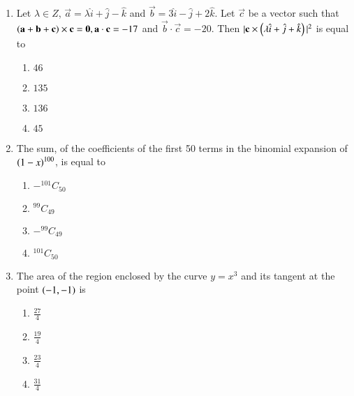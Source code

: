 \documentclass[journal,12pt,twocolumn]{IEEEtran}
\theoremstyle{remark}
\begin{document}
\begin{enumerate}
\begin{align*}
\end{align*}
is a tautology 
\begin{multicols}{2}
\begin{enumerate}
    \item only$\brak{S2}$ is true
    \item only $\brak{S1}$ is true 
    \item both are false 
    \item both are true 
\end{enumerate}
\end{multicols}
\bigskip
\item Let $\lambda \in Z$, $\vec{a}=\lambda \hat{i}+\hat{j}-\hat{k}$ and $\vec{b}=3\hat{i}-\hat{j}+2\hat{k}$. Let $\vec{c}$ be a vector such that $\left(\mathbf{a}+\mathbf{b}+\mathbf{c}\right)\times \mathbf{c=0},\mathbf{a}\cdot \mathbf{c}=-17$ and $\vec{b}\cdot \vec{c}=-20$. Then $|\mathbf{c}\times \left(\lambda \hat{i}+\hat{j}+\hat{k}\right)|^2$ is equal to 
\begin{multicols}{2}
\begin{enumerate}
         \item $46$
       \item $135$
       \item $136$
       \item $45$
\end{enumerate}
\end{multicols}
\bigskip
\item The sum, of the coefficients of the first 50 terms in the binomial expansion of $\left(1-x\right)^{100}$, is equal to 
\begin{multicols}{2}
\begin{enumerate}
    \item $-^{101}C_{50}$
    \item $^{99}C_{49}$
    \item $-^{99}C_{49}$
    \item $^{101}C_{50}$
\end{enumerate}
\end{multicols}
\bigskip
\item The area of the region enclosed by the curve $y=x^3$ and its tangent at the point $\left(-1,-1\right)$ is
\begin{multicols}{2}
\begin{enumerate}
    \item $\frac{27}{4}$
    \item $\frac{19}{4}$
    \item $\frac{23}{4}$
    \item $\frac{31}{4}$

\end{enumerate}
\end{multicols}
\end{enumerate}
\end{document}
